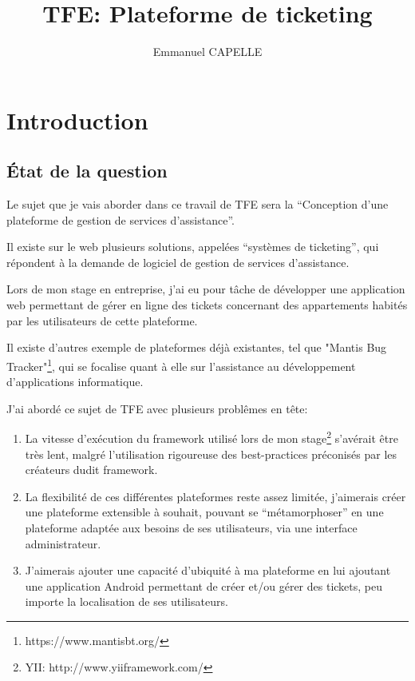 \documentclass[12pt,table,a4paper]{report}
\title{TFE: Plateforme de ticketing}
\author{Emmanuel CAPELLE}
\date{}
\begin{document}
\maketitle

\newpage

\tableofcontents

\newpage

\chapter{Introduction}

\section{État de la question}
Le sujet que je vais aborder dans ce travail de TFE sera la “Conception d’une plateforme de gestion de services d’assistance”.

Il existe sur le web plusieurs solutions, appelées “systèmes de ticketing”, qui répondent à la demande de logiciel de gestion de services d’assistance.

Lors de mon stage en entreprise, j’ai eu pour tâche de développer une application web permettant de gérer en ligne des tickets concernant des appartements habités par les utilisateurs de cette plateforme.

Il existe d’autres exemple de plateformes déjà existantes, tel que "Mantis Bug Tracker"\footnote{https://www.mantisbt.org/}, qui se focalise quant à elle sur l’assistance au développement d’applications informatique.

J’ai abordé ce sujet de TFE avec plusieurs problêmes en tête:
\begin{enumerate}
\item{La vitesse d’exécution du framework utilisé lors de mon stage\footnote{YII: http://www.yiiframework.com/} s’avérait être très lent, malgré l’utilisation rigoureuse des best-practices préconisés par les créateurs dudit framework.}
\item{La flexibilité de ces différentes plateformes reste assez limitée, j’aimerais créer une plateforme extensible à souhait, pouvant se "`métamorphoser"' en une plateforme adaptée aux besoins de ses utilisateurs, via une interface administrateur.}
\item{J’aimerais ajouter une capacité d’ubiquité à ma plateforme en lui ajoutant une application Android permettant de créer et/ou gérer des tickets, peu importe la localisation de ses utilisateurs.}
\end{enumerate}
\end{document}
